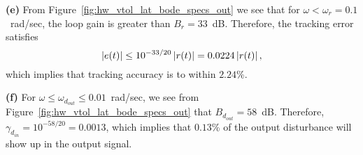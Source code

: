 {\bf (e)}
From Figure~\ref{fig:hw_vtol_lat_bode_specs_out} we see that for $\omega<\omega_r=0.1$~rad/sec, the loop gain is greater than $B_r=33$~dB.  Therefore, the tracking error satisfies
\[
\left|e(t)\right|\leq 10^{-33/20}\left|r(t)\right| =0.0224 \left|r(t)\right|,
\]
which implies that tracking accuracy is to within $2.24$\%.

{\bf (f)}
For $\omega\leq\omega_{d_{out}}\leq 0.01$~rad/sec, we see from Figure~\ref{fig:hw_vtol_lat_bode_specs_out} that $B_{d_{out}} = 58$~dB.  Therefore, $\gamma_{d_{in}} = 10^{-58/20} = 0.0013$, which implies that $0.13$\% of the output disturbance will show up in the output signal.

